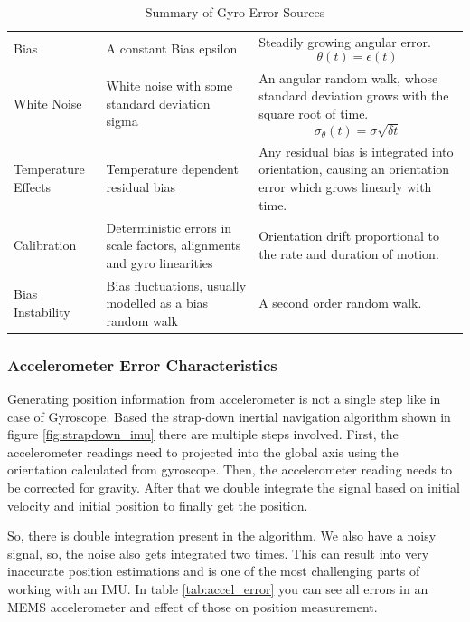 \begin{table}[ht]
    \centering
\begin{tabular}{ l| L| L } \hline
      &  &  \\ \hline
     Bias & 
     A constant Bias epsilon & 
     Steadily growing angular error.  \[\theta(t) = \epsilon(t)\] \\
     \hline
     White Noise & 
     White noise with some standard deviation sigma & 
     An angular random walk, whose standard deviation grows with the square root of time. 
     \[\sigma_\theta(t) = \sigma \sqrt{\delta t}\] \\
     \hline
     Temperature Effects & 
     Temperature dependent residual bias & 
     Any residual bias is integrated into orientation, causing an orientation error which grows linearly with time. \\
     \hline
     Calibration & 
     Deterministic errors in scale factors, alignments and gyro linearities & 
     Orientation drift proportional to the rate and duration of motion. \\
     \hline
     Bias Instability & 
     Bias fluctuations, usually modelled as a bias random walk & 
     A second order random walk. \\
     \hline
\end{tabular}
    \caption{Summary of Gyro Error Sources \citep{woodman2007introduction}}
    \label{tab:gyro_error}
\end{table}

\subsubsection{Accelerometer Error Characteristics}
Generating position information from accelerometer is not a single step like in case of Gyroscope. Based the strap-down inertial navigation algorithm shown in figure \ref{fig:strapdown_imu} there are multiple steps involved. First, the accelerometer readings need to projected into the global axis using the orientation calculated from gyroscope. Then, the accelerometer reading needs to be corrected for gravity. After that we double integrate the signal based on initial velocity and initial position to finally get the position.

So, there is double integration present in the algorithm. We also have a noisy signal, so, the noise also gets integrated two times. This can result into very inaccurate position estimations and is one of the most challenging parts of working with an IMU. In table \ref{tab:accel_error} you can see all errors in an MEMS accelerometer and effect of those on position measurement.

